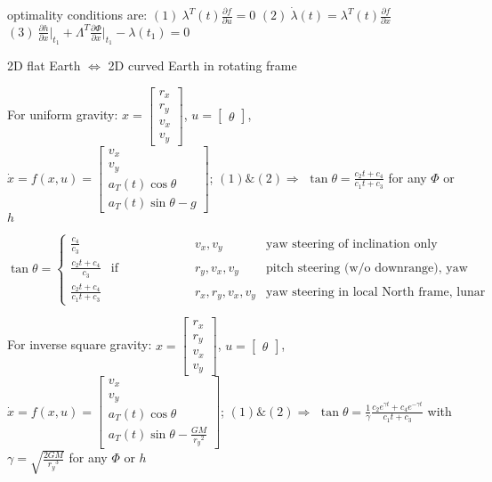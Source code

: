 \documentclass[11pt,landscape]{article}
\begin{document}
optimality conditions are:
$(1)\ \lambda^T(t) \frac{\partial f}{\partial u} = 0$ \quad
$(2)\ \dot{\lambda}(t) = \lambda^T(t) \frac{\partial f}{\partial x}$ \quad
$(3)\ \frac{\partial h}{\partial x}\Big|_{t_1} + 
\Lambda^T \frac{\partial \Phi}{\partial x}\Big|_{t_1} - 
\lambda(t_1) = 0$

2D flat Earth $\Leftrightarrow$ 2D curved Earth in rotating frame

For uniform gravity:
$x = \begin{bmatrix} r_x \\ r_y \\ v_x \\ v_y \end{bmatrix}$,
$u = \begin{bmatrix} \theta \end{bmatrix}$,
$\dot{x} = f(x, u) = 
\begin{bmatrix} v_x \\ v_y \\ a_T(t)\cos\theta \\ a_T(t)\sin\theta - g
\end{bmatrix}$;
$(1) \& (2) \Rightarrow$
$\tan\theta = \frac{c_2 t + c_4}{c_1 t + c_3}$
for any $\Phi$ or $h$

$
\tan\theta = \left\{
\begin{matrix}
\frac{c_4}{c_3} & & v_x, v_y &
  \text{yaw steering of inclination only} \\
\frac{c_2 t + c_4}{c_3} & \text{if constraining} & r_y, v_x, v_y &
  \text{pitch steering (w/o downrange), yaw steering in insertion plane} \\
\frac{c_2 t + c_4}{c_1 t + c_3} & & r_x, r_y, v_x, v_y &
  \text{yaw steering in local North frame, lunar landing}
\end{matrix}
\right.
$

For inverse square gravity:
$x = \begin{bmatrix} r_x \\ r_y \\ v_x \\ v_y \end{bmatrix}$,
$u = \begin{bmatrix} \theta \end{bmatrix}$,
$\dot{x} = f(x, u) = 
\begin{bmatrix} v_x \\ v_y \\ a_T(t)\cos\theta \\ 
a_T(t)\sin\theta - \frac{GM}{{r_y}^2} \end{bmatrix}$;
$(1) \& (2) \Rightarrow$
$\tan\theta = \frac{1}{\gamma}\frac{c_2 e^{\gamma t}+c_4 e^{-\gamma t}}{c_1 t + c_3}$
with $\gamma = \sqrt{\frac{2GM}{{r_y}^3}}$ 
for any $\Phi$ or $h$
\end{document}
